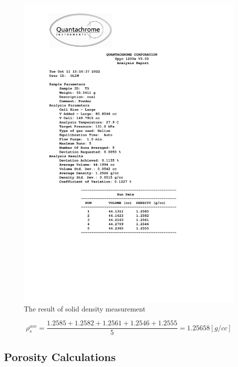\documentclass[a4paper,fleqn]{cas-dc}
\begin{document}
\begin{figure}[!h]
	\centering 
	\includegraphics[trim=2cm 6cm 4cm 0cm, clip,width=\columnwidth]{Sections/ultraReportT5.pdf}
	\caption{The result of solid density measurement}
\end{figure}

{\footnotesize
	\begin{equation*}
		\rho_s^{ave} = \frac{1.2585+1.2582+1.2561+1.2546+1.2555}{5} = 1.25658 [g/cc]
	\end{equation*}
}

\subsection{Porosity Calculations} \label{CH: Porosity}

\end{document}
